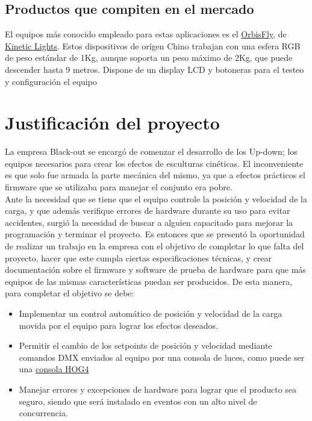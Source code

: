 \subsection{Productos que compiten en el mercado}
El equipos más conocido empleado para estas aplicaciones es el \href{http://www.eastsunlite.com/p31.html}{OrbisFly}, de \href{https://www.kinetic-lights.com/}{Kinetic Lights}. Estos dispositivos de orígen Chino trabajan con una esfera RGB de peso estándar de 1Kg, aunque soporta un peso máximo de 2Kg, que puede descender hasta 9 metros. Dispone de un display LCD y botoneras para el testeo y configuración el equipo\\

\newpage
\section{Justificación del proyecto}
La empresa Black-out se encargó de comenzar el desarrollo de los Up-down; los equipos necesarios para crear los efectos de esculturas cinéticas. El inconveniente es que solo fue armada la parte mecánica del mismo, ya que a efectos prácticos el firmware que se utilizaba para manejar el conjunto era pobre.\\
Ante la necesidad que se tiene que el equipo controle la posición y velocidad de la carga, y que además verifique errores de hardware durante su uso para evitar accidentes, surgió la necesidad de buscar a alguien capacitado para mejorar la programación y terminar el proyecto.
Es entonces que se presentó la oportunidad de realizar un trabajo en la empresa con el objetivo de completar lo que falta del proyecto, hacer que este cumpla ciertas especificaciones técnicas, y crear documentación sobre el firmware y software de prueba de hardware para que más equipos de las mismas características puedan ser producidos. De esta manera, para completar el objetivo se debe:
\begin{itemize}
	\item Implementar un control automático de posición y velocidad de la carga movida por el equipo para lograr los efectos deseados.
	\item Permitir el cambio de los setpoints de posición y velocidad mediante comandos DMX enviados al equipo por una consola de luces, como puede ser una \href{https://www2.highend.com/products/controllers/Hog4Console.asp}{consola HOG4}
	\item Manejar errores y excepciones de hardware para lograr que el producto sea seguro, siendo que será instalado en eventos con un alto nivel de concurrencia.
\end{itemize}




